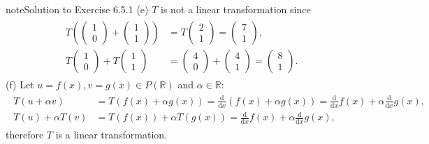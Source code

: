 \documentclass[letterpaper,10pt,english]{jupyterBook}
\begin{document}
\begin{sphinxadmonition}{note}{Solution to Exercise 6.5.1}
\sphinxAtStartPar
(e) \(T\) is not a linear transformation since
\begin{equation*}
\begin{split} \begin{align*}
    T\left( \begin{pmatrix} 1 \\ 0 \end{pmatrix} + \begin{pmatrix} 1 \\ 1 \end{pmatrix} \right)
    &= T \begin{pmatrix} 2 \\ 1 \end{pmatrix} 
    = \begin{pmatrix} 7 \\ 1 \end{pmatrix}, \\
    T\begin{pmatrix} 1 \\ 0 \end{pmatrix} + T \begin{pmatrix} 1 \\ 1 \end{pmatrix} 
    &= \begin{pmatrix} 4 \\ 0 \end{pmatrix} + \begin{pmatrix} 4 \\ 1 \end{pmatrix} 
    = \begin{pmatrix} 8 \\ 1 \end{pmatrix}.
\end{align*} \end{split}
\end{equation*}
\sphinxAtStartPar
(f) Let \(u = f(x), v = g(x) \in P(\mathbb{R})\) and \(\alpha \in \mathbb{R}\):
\begin{equation*}
\begin{split} \begin{align*}
    T(u + \alpha v) &= T(f(x) + \alpha g(x)) = \frac{\mathrm{d}}{\mathrm{d} x}(f(x) + \alpha g(x)) 
    = \frac{\mathrm{d}}{\mathrm{d} x}f(x) + \alpha \frac{\mathrm{d}}{\mathrm{d} x} g(x), \\
    T(u) + \alpha T(v) &= T(f(x)) + \alpha T(g(x)) 
    = \frac{\mathrm{d}}{\mathrm{d} x}f(x) + \alpha \frac{\mathrm{d}}{\mathrm{d} x}g(x),
\end{align*} \end{split}
\end{equation*}
\sphinxAtStartPar
therefore \(T\) is a linear transformation.


\end{sphinxadmonition}
\end{document}
